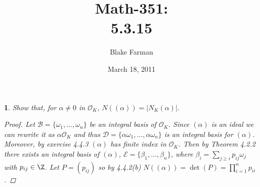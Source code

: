 \documentclass[10pt]{amsart}
\author{Blake Farman}
\title{Math-351:\\5.3.15}
\date{March 18, 2011}\pdfpagewidth 8.5in
\begin{document}
\maketitle

\newtheorem{thm}{}

\newcommand{\OO}{\mathcal{O}}
\newcommand{\BB}{\mathcal{B}}
\newcommand{\EE}{\mathcal{E}}
\newcommand{\DD}{\mathcal{D}}

\begin{thm}
  Show that, for $\alpha \not = 0$ in $\OO_K$, $N((\alpha)) = |N_K(\alpha)|$.
  \begin{proof}
    Let $\BB = \{\omega_1, \ldots, \omega_n\}$ be an integral basis of $\OO_K$.
    Since $(\alpha)$ is an ideal we can rewrite it as $\alpha\OO_K$ and thus $\DD = \{\alpha\omega_1, \ldots, \alpha\omega_n\}$ is an integral basis for $(\alpha)$.
    Moreover, by exercise 4.4.3 $(\alpha)$ has finite index in $\OO_K$.
    Then by Theorem 4.2.2 there exists an integral basis of $(\alpha)$, $\EE = \{\beta_1, \ldots, \beta_n\}$, where $\beta_i = \sum_{j \geq i} p_{ij}\omega_j$ with $p_{ij} \in \Z$.
    Let $P = (p_{ij})$ so by 4.4.2(b) $N((\alpha)) = \det(P) = \prod_{i=1}^n p_{ii}$.
    

\end{proof}
\end{thm}
\end{document}
